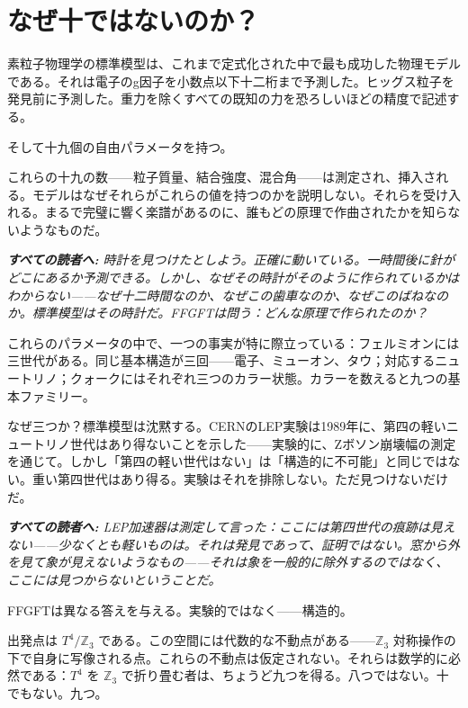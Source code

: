 \documentclass[11pt,openany]{book}
\newenvironment{laierspur}{%
  \par\vspace{4pt}%
  \noindent\small\itshape\color{blue!60!black}%
  \textbf{すべての読者へ:}\enspace\ignorespaces}{%
  \par\vspace{4pt}\normalsize\normalfont\normalcolor}
\begin{document}
\chapter{なぜ十ではないのか？}

素粒子物理学の標準模型は、これまで定式化された中で最も成功した物理モデルである。それは電子のg因子を小数点以下十二桁まで予測した。ヒッグス粒子を発見前に予測した。重力を除くすべての既知の力を恐ろしいほどの精度で記述する。

そして十九個の自由パラメータを持つ。

これらの十九の数——粒子質量、結合強度、混合角——は測定され、挿入される。モデルはなぜそれらがこれらの値を持つのかを説明しない。それらを受け入れる。まるで完璧に響く楽譜があるのに、誰もどの原理で作曲されたかを知らないようなものだ。

\begin{laierspur}
時計を見つけたとしよう。正確に動いている。一時間後に針がどこにあるか予測できる。しかし、なぜその時計がそのように作られているかはわからない——なぜ十二時間なのか、なぜこの歯車なのか、なぜこのばねなのか。標準模型はその時計だ。FFGFTは問う：どんな原理で作られたのか？
\end{laierspur}

これらのパラメータの中で、一つの事実が特に際立っている：フェルミオンには三世代がある。同じ基本構造が三回——電子、ミューオン、タウ；対応するニュートリノ；クォークにはそれぞれ三つのカラー状態。カラーを数えると九つの基本ファミリー。

なぜ三つか？標準模型は沈黙する。CERNのLEP実験は1989年に、第四の軽いニュートリノ世代はあり得ないことを示した——実験的に、Zボソン崩壊幅の測定を通じて。しかし「第四の軽い世代はない」は「構造的に不可能」と同じではない。重い第四世代はあり得る。実験はそれを排除しない。ただ見つけないだけだ。

\begin{laierspur}
LEP加速器は測定して言った：ここには第四世代の痕跡は見えない——少なくとも軽いものは。それは発見であって、証明ではない。窓から外を見て象が見えないようなもの——それは象を一般的に除外するのではなく、ここには見つからないということだ。
\end{laierspur}

FFGFTは異なる答えを与える。実験的ではなく——構造的。

出発点は $T^4/\mathbb{Z}_3$ である。この空間には代数的な不動点がある——$\mathbb{Z}_3$ 対称操作の下で自身に写像される点。これらの不動点は仮定されない。それらは数学的に必然である：$T^4$ を $\mathbb{Z}_3$ で折り畳む者は、ちょうど九つを得る。八つではない。十でもない。九つ。
\end{document}
